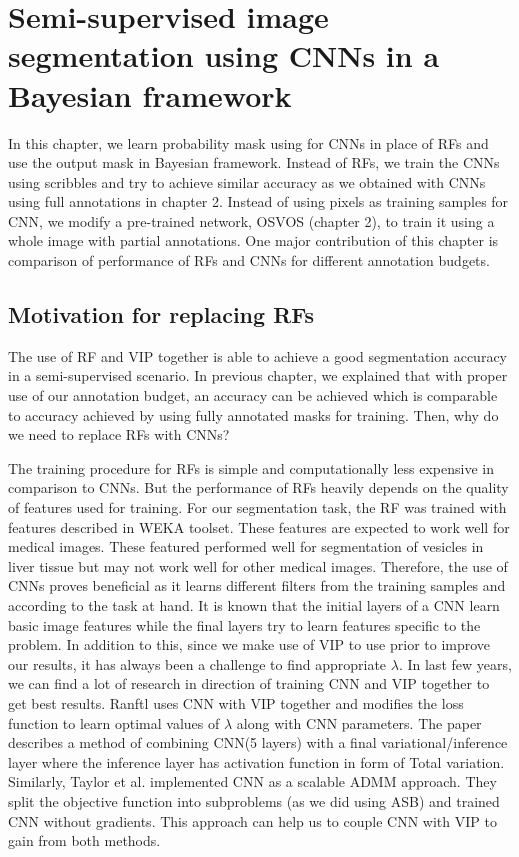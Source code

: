 \chapter{Semi-supervised image segmentation using CNNs in a Bayesian framework}
 In this chapter, we learn probability mask using for CNNs in place of RFs and use the output mask in Bayesian framework. Instead of RFs, we train the CNNs using scribbles and try to achieve similar accuracy as we obtained with CNNs using full annotations in chapter 2. Instead of using pixels as training samples for CNN, we modify a pre-trained network, OSVOS (chapter 2), to train it using a whole image with partial annotations. One major contribution of this chapter is comparison of performance of RFs and CNNs for different annotation budgets.
\section{Motivation for replacing RFs}
The use of RF and VIP together is able to achieve a good segmentation accuracy in a semi-supervised scenario. In previous chapter, we explained that with proper use of our annotation budget, an accuracy can be achieved which is comparable to accuracy achieved by using fully annotated masks for training. Then, why do we need to replace RFs with CNNs? \par
The training procedure for RFs is simple and computationally less expensive in comparison to CNNs. But the performance of RFs heavily depends on the quality of features used for training. For our segmentation task, the RF was trained with features described in WEKA toolset. These features are expected to work well for medical images. These featured performed well for segmentation of vesicles in liver tissue but may not work well for other medical images. Therefore, the use of CNNs proves beneficial as it learns different filters from the training samples and according to the task at hand. It is known that the initial layers of a CNN learn basic image features while the final layers try to learn features specific to the problem. In addition to this, since we make use of VIP to use prior to improve our results, it has always been a challenge to find appropriate $\lambda$. In last few years, we can find a lot of research in direction of training CNN and VIP together to get best results. Ranftl \cite{ranftl:2014} uses CNN with VIP together and modifies the loss function to learn optimal values of $\lambda$ along with CNN parameters. The paper describes a method of combining CNN(5 layers) with a final variational/inference layer where the inference layer has activation function in form of Total variation. Similarly, Taylor et al. \cite{taylor:2016} implemented CNN as a scalable ADMM approach. They split the objective function into subproblems (as we did using ASB) and trained CNN without gradients. This approach can help us to couple CNN with VIP to gain from both methods.

